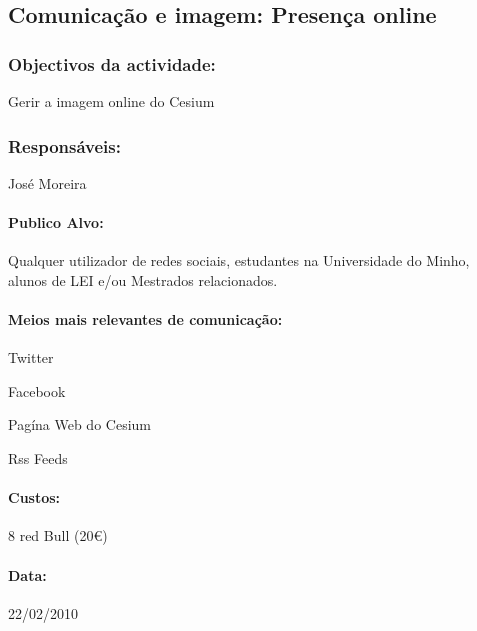 \subsection{Comunicação e imagem: Presença online} %

\subsubsection*{Objectivos da actividade:}
Gerir a imagem online do Cesium

\subsubsection*{Responsáveis:}
\begin{itemizedash}
	\item{José Moreira}
\end{itemizedash}

\paragraph{Publico Alvo: }
Qualquer utilizador de redes sociais, estudantes na Universidade do Minho, alunos de LEI e/ou Mestrados relacionados.

\paragraph{Meios mais relevantes de comunicação:}
\begin{itemizedash}
	\item Twitter
	\item Facebook
	\item Pagína Web do Cesium
	\item Rss Feeds
\end{itemizedash}

\paragraph{Custos:}
\begin{itemizedash}
	\item 8 red Bull (20€)
\end{itemizedash}

\paragraph{Data:} 22/02/2010

\vspace{20pt}
